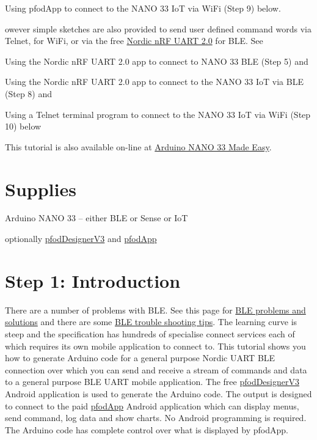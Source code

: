Using pfodApp to connect to the NANO 33 IoT via WiFi (Step 9) below.
    
owever simple sketches are also provided to send user defined command words via Telnet, for WiFi, or via the free \href{https://play.google.com/store/apps/details?id=com.nordicsemi.nrfUARTv2&hl=en&pli=1}{Nordic nRF UART 2.0} for BLE. See

Using the Nordic nRF UART 2.0 app to connect to NANO 33 BLE (Step 5) and

Using the Nordic nRF UART 2.0 app to connect to the NANO 33 IoT via BLE (Step 8) and

Using a Telnet terminal program to connect to the NANO 33 IoT via WiFi (Step 10) below
    
This tutorial is also available on-line at \href{https://www.forward.com.au/pfod/BLE/Nano33/index.html}{Arduino NANO 33 Made Easy}.


\section{Supplies}

Arduino NANO 33 -- either BLE or Sense or IoT

optionally \href{https://www.forward.com.au/pfod/pfodDesigner/index.html}{pfodDesignerV3} and \href{https://www.forward.com.au/pfod/index.html}{pfodApp}

\section{Step 1: Introduction}

 There are a number of problems with BLE. See this page for \href{https://www.forward.com.au/pfod/BLE/BLEProblems/index.html}{BLE problems and solutions} and there are some \href{https://www.forward.com.au/pfod/BLE/index.html#TroubleShooting}{BLE trouble shooting tips}. The learning curve is steep and the specification has hundreds of specialise connect services each of which requires its own mobile application to connect to. This tutorial shows you how to generate Arduino code for a general purpose Nordic UART BLE connection over which you can send and receive a stream of commands and data to a general purpose BLE UART mobile application. The free \href{https://www.forward.com.au/pfod/pfodDesigner/index.html}{pfodDesignerV3} Android application is used to generate the Arduino code. The output is designed to connect to the paid \href{https://www.forward.com.au/pfod/index.html}{pfodApp} Android application which can display menus, send command, log data and show charts. No Android programming is required. The Arduino code has complete control over what is displayed by pfodApp.
    
